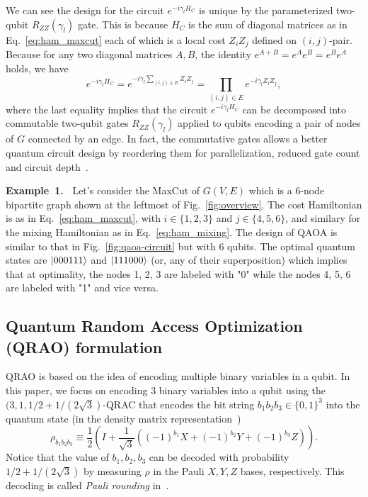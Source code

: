\documentclass[conference,10pt]{IEEEtran}
\begin{document}
We can see the design for the circuit $e^{-i\gamma_l H_C}$ is unique by the parameterized two-qubit $R_{ZZ}(\gamma_l)$ gate. This is because $H_C$ is the sum of diagonal matrices as in Eq.~\eqref{eq:ham_maxcut} each of which is a local cost $Z_iZ_j$ defined on $(i,j)$-pair. Because for any two diagonal matrices $A, B$, the identity $e^{A + B} = e^{A} e^{B} = e^{B} e^{A}$ holds, we have 
\begin{equation}
    e^{-i\gamma_lH_C} = e^{-i\gamma_l \sum_{(i,j)\in E}Z_i Z_j} = \prod_{(i,j)\in E} e^{-i\gamma_l Z_i Z_j},\label{eq:diagonalHamdecompose}
\end{equation}
where the last equality implies that the circuit $e^{-i\gamma_l H_C}$ can be decomposed into commutable two-qubit gates $R_{ZZ}(\gamma_l)$ applied to qubits encoding a pair of nodes of $G$ connected by an edge. In fact, the commutative gates allows a better quantum circuit design by reordering them for parallelization, reduced gate count and circuit depth~\cite{AlamSakiGosh2020}. 

\noindent\textbf{Example~1.~} Let's consider the MaxCut of $G(V,E)$ which is a 6-node bipartite graph shown at the leftmost of Fig.~\ref{fig:overview}. The cost Hamiltonian is as in Eq.~\eqref{eq:ham_maxcut}, with $i \in \{1,2,3\}$ and $j \in \{4,5,6\}$, and similary for the mixing Hamiltonian as in Eq.~\eqref{eq:ham_mixing}. The design of QAOA is similar to that in Fig.~\ref{fig:qaoa-circuit} but with 6 qubits. The optimal quantum states are $\ket{000111}$ and $\ket{111000}$ (or, any of their superposition) which implies that at optimality, the nodes 1, 2, 3 are labeled with "0" while the nodes 4, 5, 6 are labeled with "1" and vice versa. 


\subsection{Quantum Random Access Optimization (QRAO) formulation}
QRAO is based on the idea of encoding multiple binary variables in a qubit. In this paper, we focus on encoding 3 binary variables into a qubit using the $(3,1,1/2+1/(2\sqrt{3})$-QRAC that encodes the bit string $b_1b_2b_3 \in \{0,1\}^3$ into the quantum state (in the density matrix representation~\cite{Nielsen_Chuang_2010})
\begin{equation}
    \rho_{b_1b_2b_3} \equiv \frac{1}{2}\left(I + \frac{1}{\sqrt{3}} \left((-1)^{b_1} X + (-1)^{b_2} Y + (-1)^{b_3} Z\right) \right).\label{eq:31qrac}
\end{equation}
Notice that the value of $b_1, b_2, b_3$ can be decoded with probability $1/2 + 1/(2\sqrt{3})$ by measuring $\rho$ in the Pauli $X, Y, Z$ bases, respectively. This decoding is called \emph{Pauli rounding} in~\cite{Fulleretal2024}. 
\end{document}
